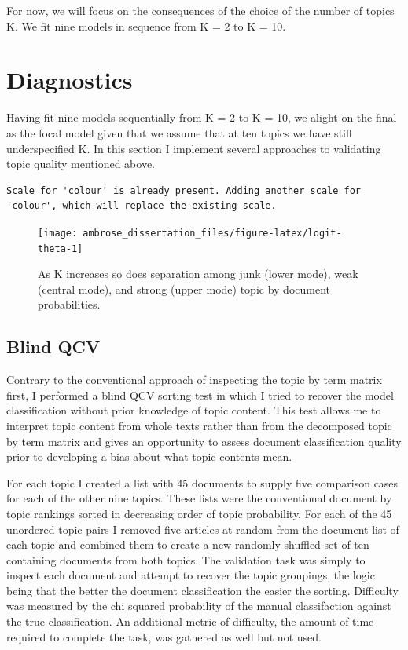 \documentclass[]{book}
\theoremstyle{definition}
\theoremstyle{definition}
\theoremstyle{definition}
\theoremstyle{remark}
\begin{document}
For now, we will focus on the consequences of the choice of the number
of topics K. We fit nine models in sequence from K = 2 to K = 10.

\hypertarget{diagnostics}{%
\section{Diagnostics}\label{diagnostics}}

Having fit nine models sequentially from K = 2 to K = 10, we alight on
the final as the focal model given that we assume that at ten topics we
have still underspecified K. In this section I implement several
approaches to validating topic quality mentioned above.

\begin{verbatim}
Scale for 'colour' is already present. Adding another scale for
'colour', which will replace the existing scale.
\end{verbatim}

\begin{figure}

{\centering \texttt{[image: ambrose\_dissertation\_files/figure-latex/logit-theta-1]} 

}

\caption{As K increases so does separation among junk (lower mode), weak (central mode), and strong (upper mode) topic by document probabilities.}\label{fig:logit-theta}
\end{figure}

\hypertarget{blind-qcv}{%
\subsection{Blind QCV}\label{blind-qcv}}

Contrary to the conventional approach of inspecting the topic by term
matrix first, I performed a blind QCV sorting test in which I tried to
recover the model classification without prior knowledge of topic
content. This test allows me to interpret topic content from whole texts
rather than from the decomposed topic by term matrix and gives an
opportunity to assess document classification quality prior to
developing a bias about what topic contents mean.

For each topic I created a list with 45 documents to supply five
comparison cases for each of the other nine topics. These lists were the
conventional document by topic rankings sorted in decreasing order of
topic probability. For each of the 45 unordered topic pairs I removed
five articles at random from the document list of each topic and
combined them to create a new randomly shuffled set of ten containing
documents from both topics. The validation task was simply to inspect
each document and attempt to recover the topic groupings, the logic
being that the better the document classification the easier the
sorting. Difficulty was measured by the chi squared probability of the
manual classifaction against the true classification. An additional
metric of difficulty, the amount of time required to complete the task,
was gathered as well but not used.
\end{document}
